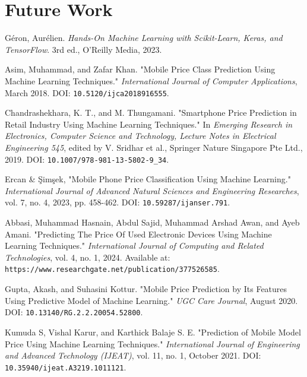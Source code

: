 \documentclass[12pt]{report}
\begin{document}
\section{Future Work}

\renewcommand{\bibname}{References}
\begin{thebibliography}{9}
	Géron, Aurélien. \textit{Hands-On Machine Learning with Scikit-Learn, Keras, and TensorFlow}. 3rd ed., O'Reilly Media, 2023.

	Asim, Muhammad, and Zafar Khan. "Mobile Price Class Prediction Using Machine Learning Techniques." \textit{International Journal of Computer Applications}, March 2018. DOI: \texttt{10.5120/ijca2018916555}.

	Chandrashekhara, K. T., and M. Thungamani. "Smartphone Price Prediction in Retail Industry Using Machine Learning Techniques." In \textit{Emerging Research in Electronics, Computer Science and Technology, Lecture Notes in Electrical Engineering 545}, edited by V. Sridhar et al., Springer Nature Singapore Pte Ltd., 2019. DOI: \texttt{10.1007/978-981-13-5802-9\_34}.

	Ercan \&  Şimşek, "Mobile Phone Price Classification Using Machine Learning." \textit{International Journal of Advanced Natural Sciences and Engineering Researches}, vol. 7, no. 4, 2023, pp. 458-462. DOI: \texttt{10.59287/ijanser.791}.

	Abbasi, Muhammad Hasnain, Abdul Sajid, Muhammad Arshad Awan, and Ayeb Amani. "Predicting The Price Of Used Electronic Devices Using Machine Learning Techniques." \textit{International Journal of Computing and Related Technologies}, vol. 4, no. 1, 2024. Available at: \texttt{https://www.researchgate.net/publication/377526585}.

	Gupta, Akash, and Suhasini Kottur. "Mobile Price Prediction by Its Features Using Predictive Model of Machine Learning." \textit{UGC Care Journal}, August 2020. DOI: \texttt{10.13140/RG.2.2.20054.52800}.

	Kumuda S, Vishal Karur, and Karthick Balaje S. E. "Prediction of Mobile Model Price Using Machine Learning Techniques." \textit{International Journal of Engineering and Advanced Technology (IJEAT)}, vol. 11, no. 1, October 2021. DOI: \texttt{10.35940/ijeat.A3219.1011121}.

\end{thebibliography}
\end{document}
